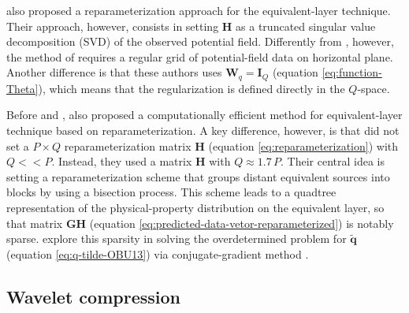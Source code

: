 \cite{mendonca-2020} also proposed a reparameterization approach for the equivalent-layer technique.
Their approach, however, consists in setting $\mathbf{H}$ as a truncated singular value decomposition
(SVD) \cite[e.g.,][p. 55]{aster_etal2019} of the observed potential field. 
Differently from \cite{oliveirajr-etal2013}, however, the method of \cite{mendonca-2020} requires 
a regular grid of potential-field data on horizontal plane.
Another difference is that these authors uses $\mathbf{W}_{q} = \mathbf{I}_{Q}$ (equation \ref{eq:function-Theta}),
which means that the regularization is defined directly in the $Q$-space.

Before \cite{oliveirajr-etal2013} and \cite{mendonca-2020}, \cite{barnes-lumley_2011} also proposed a computationally
efficient method for equivalent-layer technique based on reparameterization. 
A key difference, however, is that \cite{barnes-lumley_2011} did not set a $P \times Q$ reparameterization matrix $\mathbf{H}$
(equation \ref{eq:reparameterization}) with $Q << P$. 
Instead, they used a matrix $\mathbf{H}$ with $Q \approx 1.7 \, P$. 
Their central idea is setting a reparameterization scheme that groups distant equivalent sources into blocks by
using a bisection process. 
This scheme leads to a quadtree representation of the physical-property distribution on the equivalent layer, 
so that matrix $\mathbf{G}\mathbf{H}$ (equation \ref{eq:predicted-data-vetor-reparameterized}) is notably sparse.
\cite{barnes-lumley_2011} explore this sparsity in solving the overdetermined problem for $\tilde{\mathbf{q}}$
(equation \ref{eq:q-tilde-OBU13}) via conjugate-gradient method \cite[e.g.,][sec. 11.3]{golub-vanloan2013}.

\subsection{Wavelet compression}

